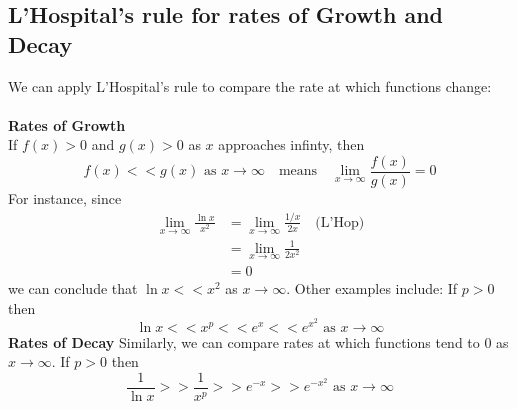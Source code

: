 \documentclass{report}
\begin{document}
\subsection{L'Hospital's rule for rates of Growth and Decay} %
We can apply L'Hospital's rule to compare the rate at which functions change:\\
\vspace{1mm}\\
\textbf{Rates of Growth}\\
If $f(x)>0$ and $g(x)>0$ as $x$ approaches infinty, then
\begin{equation*}
f(x)<<g(x)\text{ as }x\to\infty\quad\text{means}\quad\lim_{x\to\infty}\frac{f(x)}{g(x)}=0
\end{equation*}
For instance, since
\begin{align*}
\lim_{x\to\infty}\frac{\ln x}{x^2}
&=\lim_{x\to\infty}\frac{1/x}{2x}\quad\text{(L'Hop)}\\
&=\lim_{x\to\infty}\frac{1}{2x^2}\\
&=0
\end{align*}
we can conclude that $\ln x<<x^2$ as $x\to\infty$. Other examples include: If $p>0$ then
\begin{equation*}
\ln x<<x^p<<e^x<<e^{x^2}\text{ as }x\to\infty
\end{equation*}
\textbf{Rates of Decay}
Similarly, we can compare rates at which functions tend to 0 as $x\to\infty$. If $p>0$ then
\begin{equation*}
\frac{1}{\ln x}>>\frac{1}{x^p}>>e^{-x}>>e^{-x^2}\text{ as }x\to\infty
\end{equation*}
\newpage
\end{document}

